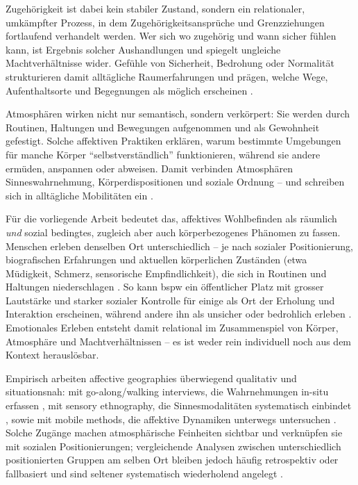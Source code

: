 Zugehörigkeit ist dabei kein stabiler Zustand, sondern ein relationaler, umkämpfter Prozess, in dem Zugehörigkeitsansprüche und Grenzziehungen fortlaufend verhandelt werden. Wer sich wo zugehörig und wann sicher fühlen kann, ist Ergebnis solcher Aushandlungen und spiegelt ungleiche Machtverhältnisse wider. Gefühle von Sicherheit, Bedrohung oder Normalität strukturieren damit alltägliche Raumerfahrungen und prägen, welche Wege, Aufenthaltsorte und Begegnungen als möglich erscheinen \parencite{antonsichSearchingBelongingAnalytical2010,painGlobalizedFearEmotional2009}.

Atmosphären wirken nicht nur semantisch, sondern verkörpert: Sie werden durch Routinen, Haltungen und Bewegungen aufgenommen und als Gewohnheit gefestigt. Solche affektiven Praktiken erklären, warum bestimmte Umgebungen für manche Körper \enquote{selbstverständlich} funktionieren, während sie andere ermüden, anspannen oder abweisen. Damit verbinden Atmosphären Sinneswahrnehmung, Körperdispositionen und soziale Ordnung -- und schreiben sich in alltägliche Mobilitäten ein \parencite{mccormackEngineeringAffectiveAtmospheres2008,bissellPassengerMobilitiesAffective2010}.

Für die vorliegende Arbeit bedeutet das, affektives Wohlbefinden als räumlich \emph{und} sozial bedingtes, zugleich aber auch körperbezogenes Phänomen zu fassen. Menschen erleben denselben Ort unterschiedlich -- je nach sozialer Positionierung, biografischen Erfahrungen und aktuellen körperlichen Zuständen (etwa Müdigkeit, Schmerz, sensorische Empfindlichkeit), die sich in Routinen und Haltungen niederschlagen \parencite{mccormackEngineeringAffectiveAtmospheres2008,bissellPassengerMobilitiesAffective2010,ahmedPhenomenologyWhiteness2007}. So kann \gls{bspw} ein öffentlicher Platz mit grosser Lautstärke und starker sozialer Kontrolle für einige als Ort der Erholung und Interaktion erscheinen, während andere ihn als unsicher oder bedrohlich erleben \parencite{collectiveSafeSpaceReconceptualization2014}. Emotionales Erleben entsteht damit relational im Zusammenspiel von Körper, Atmosphäre und Machtverhältnissen -- es ist weder rein individuell noch aus dem Kontext herauslösbar.

Empirisch arbeiten affective geographies überwiegend qualitativ und situationsnah: mit go-along/walking interviews, die Wahrnehmungen in-situ erfassen \parencite{kusenbachStreetPhenomenologyGoAlong2003}, mit sensory ethnography, die Sinnesmodalitäten systematisch einbindet \parencite{pinkDoingSensoryEthnography2009}, sowie mit mobile methods, die affektive Dynamiken unterwegs untersuchen \parencite{buscherIntroductionMobileMethods2010}. Solche Zugänge machen atmosphärische Feinheiten sichtbar und verknüpfen sie mit sozialen Positionierungen; vergleichende Analysen zwischen unterschiedlich positionierten Gruppen am selben Ort bleiben jedoch häufig retrospektiv oder fallbasiert und sind seltener systematisch wiederholend angelegt \parencite{hoSocialGeographyIII2024}.

